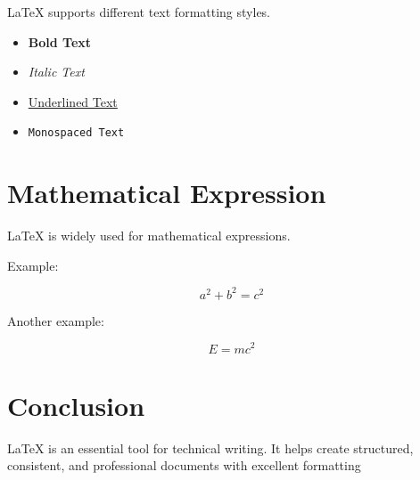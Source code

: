 \documentclass[12pt,a4paper]{article}
\begin{document}
LaTeX supports different text formatting styles.

\begin{itemize}
    \item \textbf{Bold Text}
    \item \textit{Italic Text}
    \item \underline{Underlined Text}
    \item \texttt{Monospaced Text}
\end{itemize}

\section{Mathematical Expression}

LaTeX is widely used for mathematical expressions.

Example:

\[
a^2+b^2=c^2
\]

Another example:

\[
E=mc^2
\]

\section{Conclusion}

LaTeX is an essential tool for technical writing.
It helps create structured, consistent, and professional
documents with excellent formatting
\end{document}
